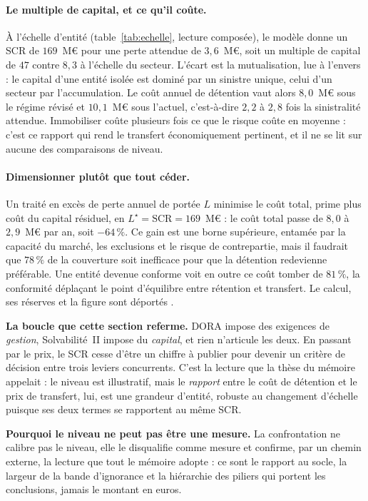 \paragraph{Le multiple de capital, et ce qu'il coûte.} À l'échelle d'entité
(table~\ref{tab:echelle}, lecture composée), le modèle donne un SCR de $169$~M\euro{} pour une
perte attendue de $3{,}6$~M\euro, soit un multiple de capital de $47$ contre $8{,}3$
à l'échelle du secteur. L'écart est la mutualisation, lue à l'envers : le capital d'une entité
isolée est dominé par un sinistre unique, celui d'un secteur par l'accumulation. Le coût annuel
de détention vaut alors $8{,}0$~M\euro{} sous le régime révisé et $10{,}1$~M\euro{} sous
l'actuel, c'est-à-dire $2{,}2$ à $2{,}8$ fois la sinistralité attendue. Immobiliser
coûte plusieurs fois ce que le risque coûte en moyenne : c'est ce rapport qui rend le transfert
économiquement pertinent, et il ne se lit sur aucune des comparaisons de niveau.

\paragraph{Dimensionner plutôt que tout céder.} Un traité en excès de perte annuel de portée $L$
minimise le coût total, prime plus coût du capital résiduel, en $L^\star=\mathrm{SCR}=169$~M\euro{} :
le coût total passe de $8{,}0$ à $2{,}9$~M\euro{} par an, soit $-64\,\%$. Ce gain est une borne
supérieure, entamée par la capacité du marché, les exclusions et le risque de contrepartie, mais il
faudrait que $78\,\%$ de la couverture soit inefficace pour que la détention redevienne
préférable. Une entité devenue conforme voit en outre ce coût tomber de $81\,\%$, la conformité
déplaçant le point d'équilibre entre rétention et transfert. Le calcul, ses réserves et la figure
sont déportés \matcomp.

\begin{cle}
\textbf{La boucle que cette section referme.} DORA impose des exigences de \emph{gestion},
Solvabilité~II impose du \emph{capital}, et rien n'articule les deux. En passant par le prix,
le SCR cesse d'être un
chiffre à publier pour devenir un critère de décision entre trois leviers concurrents.
C'est la lecture que la thèse du mémoire appelait : le niveau est illustratif, mais le
\emph{rapport} entre le coût de détention et le prix de transfert, lui, est une grandeur
d'entité, robuste au changement d'échelle puisque ses deux termes se rapportent au même SCR.
\end{cle}

\begin{cle}
\textbf{Pourquoi le niveau ne peut pas être une mesure.} La confrontation ne calibre pas le
niveau, elle le
disqualifie comme mesure et confirme, par un chemin externe, la lecture que tout le
mémoire adopte : ce sont le rapport au socle, la largeur de la bande
d'ignorance et la hiérarchie des piliers qui portent les conclusions, jamais le
montant en euros.
\end{cle}

